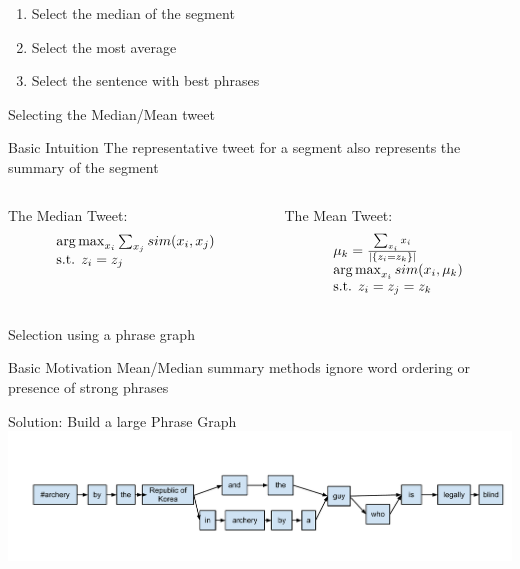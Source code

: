 \documentclass[compress]{beamer}
\DeclareMathOperator*{\argmax}{arg\,max}
\begin{document}
\begin{frame}[fragile]
\pause

\begin{block}{}
    \begin{enumerate}[<+->]
        \item Select the median of the segment \cite{takamura11SummaryStream}
        \item Select the most average 
        \item Select the sentence with best phrases \cite{nichols12SummarySports}
    \end{enumerate}
\end{block}

\end{frame}

\begin{frame}{Selecting the Median/Mean tweet}
\begin{block}{Basic Intuition}
The representative tweet for a segment also represents the summary of the segment
\end{block}

\begin{columns}[t]

\begin{column}[1]{5cm}
The Median Tweet:
\[
\begin{array}{l l}
\argmax_{x_i} \sum_{x_j} sim(x_i, x_j) \\
\text{s.t. } z_i = z_j \\
\end{array}
\]
\end{column}

\begin{column}[2]{5cm}
The Mean Tweet:
\[
\begin{array}{l l}
\mu_k = \frac{\sum_{x_i} x_i}{|\{z_i = z_k\}|} \\
\argmax_{x_i} sim(x_i, \mu_k) \\
\text{s.t. } z_i = z_j = z_k \\
\end{array}
\]
\end{column}

\end{columns}

\end{frame}

\begin{frame}{Selection using a phrase graph}
\begin{block}{Basic Motivation}
Mean/Median summary methods ignore word ordering or presence of strong phrases
\end{block}
\pause
Solution: Build a large Phrase Graph
\includegraphics[width=\textwidth,height=.50\textheight]{example-phrase-graph.pdf}
\end{frame}
\end{document}
